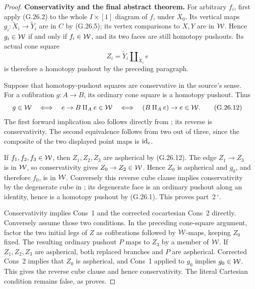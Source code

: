 \begin{proof}
\par\smallskip\noindent\textbf{Conservativity and the final abstract theorem.}\quad
For arbitrary $f_i$, first apply (G.26.2) to the whole $I\times[1]$ diagram of $f$, under $X_0$. Its vertical maps $g_i:\widetilde X_i\to\widetilde Y_i$ are in $C$ by (G.26.5); its vertex comparisons to $X,Y$ are in $\mathcal{W}$. Hence $g_i\in\mathcal{W}$ if and only if $f_i\in\mathcal{W}$, and its two faces are still homotopy pushouts. Its actual cone square
\[
Z_i=\widetilde Y_i\amalg_{\widetilde X_i}e
\]
is therefore a homotopy pushout by the preceding paragraph.

Suppose that homotopy-pushout squares are conservative in the source's sense. For a cofibration $g:A\to B$, its ordinary cone square is a homotopy pushout. Thus
\[
g\in\mathcal{W}
\quad\Longleftrightarrow\quad
e\to B\amalg_Ae\in\mathcal{W}
\quad\Longleftrightarrow\quad
(B\amalg_Ae)\to e\in\mathcal{W}.                                    \tag{G.26.12}
\]
The first forward implication also follows directly from ; its reverse is conservativity. The second equivalence follows from two out of three, since the composite of the two displayed point maps is $\mathrm{id}_e$.

If $f_1,f_2,f_3\in\mathcal{W}$, then $Z_1,Z_2,Z_3$ are aspherical by (G.26.12). The edge $Z_1\to Z_3$ is in $\mathcal{W}$, so conservativity gives $Z_0\to Z_2\in\mathcal{W}$. Hence $Z_0$ is aspherical and $g_0$, and therefore $f_0$, is in $\mathcal{W}$. Conversely this reverse cube clause implies conservativity by the degenerate cube in ; its degenerate face is an ordinary pushout along an identity, hence is a homotopy pushout by (G.26.1). This proves part~2\,$^\circ$.

Conservativity implies Cons~1 and the corrected cocartesian Cons~2 directly. Conversely assume those two conditions. In the preceding cone-square argument, factor the two initial legs of $Z$ as cofibrations followed by $\mathcal{W}$-maps, keeping $Z_0$ fixed. The resulting ordinary pushout $P$ maps to $Z_3$ by a member of $\mathcal{W}$. If $Z_1,Z_2,Z_3$ are aspherical, both replaced branches and $P$ are aspherical. Corrected Cons~2 implies that $Z_0$ is aspherical, and Cons~1 applied to $g_0$ implies $g_0\in\mathcal{W}$. This gives the reverse cube clause and hence conservativity. The literal Cartesian condition remains false, as  proves.


\end{proof}
